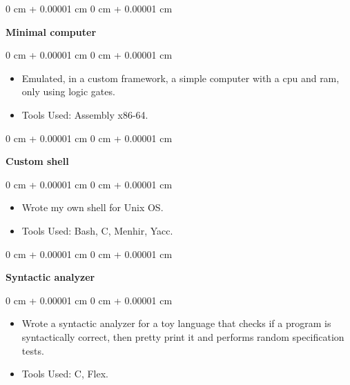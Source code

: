 \documentclass[10pt, letterpaper]{article}
\newenvironment{highlights}{
    \begin{itemize}[
        topsep=0.10 cm,
        parsep=0.10 cm,
        partopsep=0pt,
        itemsep=0pt,
        leftmargin=0 cm + 10pt
    ]
}{
    \end{itemize}
} %
\newenvironment{onecolentry}{
    \begin{adjustwidth}{
        0 cm + 0.00001 cm
    }{
        0 cm + 0.00001 cm
    }
}{
    \end{adjustwidth}
} %
\begin{document}
        \vspace{0.2 cm}
        
        \begin{onecolentry}
            \textbf{Minimal computer}\end{onecolentry}

        \vspace{0.10 cm}
        \begin{onecolentry}
            \begin{highlights}
                \item Emulated, in a custom framework, a simple computer with a cpu and ram, only using logic gates.
                \item Tools Used: Assembly x86-64.
            \end{highlights}
        \end{onecolentry}

        \vspace{0.2 cm}        
        
        \begin{onecolentry}
            \textbf{Custom shell}\end{onecolentry}

        \vspace{0.10 cm}
        \begin{onecolentry}
            \begin{highlights}
                \item Wrote my own shell for Unix OS.
                \item Tools Used: Bash, C, Menhir, Yacc.
            \end{highlights}
        \end{onecolentry}

        \vspace{0.2 cm}
        
        \begin{onecolentry}
            \textbf{Syntactic analyzer}\end{onecolentry}

        \vspace{0.10 cm}
        \begin{onecolentry}
            \begin{highlights}
                \item Wrote a syntactic analyzer for a toy language that checks if a program is syntactically correct, then pretty print it and performs random specification tests.
                \item Tools Used: C, Flex.
            \end{highlights}
        \end{onecolentry}
\end{document}
